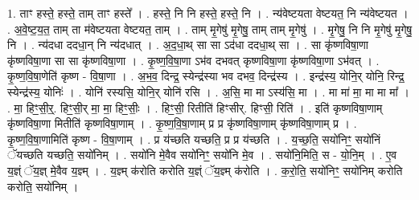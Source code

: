 \documentclass[17pt]{extarticle}
\begin{document}
1. ताꣳ हस्ते॒ हस्ते॒ ताम् ताꣳ हस्ते᳚ । . हस्ते॒ नि नि हस्ते॒ हस्ते॒ नि । . न्य॑वेष्टयता वेष्टयत॒ नि न्य॑वेष्टयत । . अ॒वे॒ष्ट॒य॒त॒ ताम् ता म॑वेष्टयता वेष्टयत॒ ताम् । . ताम् मृ॒गेषु॑ मृ॒गेषु॒ ताम् ताम् मृ॒गेषु॑ । . मृ॒गेषु॒ नि नि मृ॒गेषु॑ मृ॒गेषु॒ नि । . न्य॑दधा ददधा॒न् नि न्य॑दधात् । . अ॒द॒धा॒थ् सा सा ऽद॑धा ददधा॒थ् सा । . सा कृ॑ष्णविषा॒णा कृ॑ष्णविषा॒णा सा सा कृ॑ष्णविषा॒णा । . कृ॒ष्ण॒वि॒षा॒णा ऽभ॑व दभवत् कृष्णविषा॒णा कृ॑ष्णविषा॒णा ऽभ॑वत् । . कृ॒ष्ण॒वि॒षा॒णेति॑ कृष्ण - वि॒षा॒णा । . अ॒भ॒व॒ दिन्द्र॒ स्येन्द्र॑स्या भव दभव॒ दिन्द्र॑स्य । . इन्द्र॑स्य॒ योनि॒र् योनि॒ रिन्द्र॒ स्येन्द्र॑स्य॒ योनिः॑ । . योनि॑ रस्यसि॒ योनि॒र् योनि॑ रसि । . अ॒सि॒ मा मा ऽस्य॑सि॒ मा । . मा मा॑ मा॒ मा मा मा᳚ । . मा॒ हिꣳ॒॒सी॒र्॒. हिꣳ॒॒सी॒र् मा॒ मा॒ हिꣳ॒॒सीः॒ । . हिꣳ॒॒सी॒ रितीति॑ हिꣳसीर्. हिꣳसी॒ रिति॑ । . इति॑ कृष्णविषा॒णाम् कृ॑ष्णविषा॒णा मितीति॑ कृष्णविषा॒णाम् । . कृ॒ष्ण॒वि॒षा॒णाम् प्र प्र कृ॑ष्णविषा॒णाम् कृ॑ष्णविषा॒णाम् प्र । . कृ॒ष्ण॒वि॒षा॒णामिति॑ कृष्ण - वि॒षा॒णाम् । . प्र य॑च्छति यच्छति॒ प्र प्र य॑च्छति । . य॒च्छ॒ति॒ सयो॑निꣳ॒॒ सयो॑निं ॅयच्छति यच्छति॒ सयो॑निम् । . सयो॑नि मे॒वैव सयो॑निꣳ॒॒ सयो॑नि मे॒व । . सयो॑नि॒मिति॒ स - यो॒नि॒म् । . ए॒व य॒ज्ञ्ं ॅय॒ज्ञ् मे॒वैव य॒ज्ञ्म् । . य॒ज्ञ्म् क॑रोति करोति य॒ज्ञ्ं ॅय॒ज्ञ्म् क॑रोति । . क॒रो॒ति॒ सयो॑निꣳ॒॒ सयो॑निम् करोति करोति॒ सयो॑निम् । \newline
\end{document}
